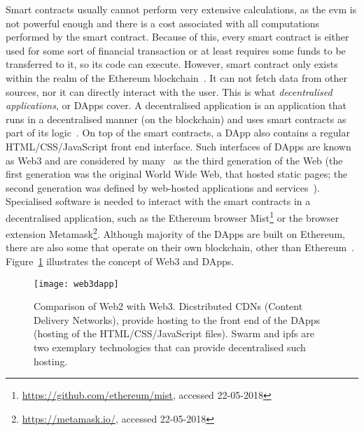 Smart contracts usually cannot perform very extensive calculations, as the \acrshort{evm} is not powerful enough and there is a cost associated with all computations performed by the smart contract. Because of this, every smart contract is either used for some sort of financial transaction or at least requires some funds to be transferred to it, so its code can execute. However, smart contract only exists within the realm of the Ethereum blockchain~\cite{JohnWeldon2016BuildingContract}. It can not fetch data from other sources, nor it can directly interact with the user. This is what \textit{decentralised applications}, or DApps cover. A decentralised application is an application that runs in a decentralised manner (on the blockchain) and uses smart contracts as part of its logic~\cite[p. 149]{Dannen2017IntroducingSolidity}. On top of the smart contracts, a DApp also contains a regular HTML/CSS/JavaScript front end interface. Such interfaces of DApps are known as Web3 and are considered by many~\cite{Dannen2017IntroducingSolidity, LukeHedger2017CrossingDevelopment} as the third generation of the Web (the first generation was the original World Wide Web, that hosted static pages; the second generation was defined by web-hosted applications and services~\cite{Dannen2017IntroducingSolidity}). Specialised software is needed to interact with the smart contracts in a decentralised application, such as the Ethereum browser Mist\footnote{\url{https://github.com/ethereum/mist}, accessed 22-05-2018} or the browser extension Metamask\footnote{\url{https://metamask.io/}, accessed 22-05-2018}. Although majority of the DApps are built on Ethereum, there are also some that operate on their own blockchain, other than Ethereum~\cite{AlyssaHertigWhatCoinDesk}. Figure~\ref{fig:web3} illustrates the concept of Web3 and DApps.

\begin{figure}
    \centering
    \texttt{[image: web3dapp]}
    \caption{Comparison of Web2 with Web3. Dicstributed CDNs (Content Delivery Networks), provide hosting to the front end of the DApps (hosting of the HTML/CSS/JavaScript files). Swarm and \acrfull{ipfs} are two exemplary technologies that can provide decentralised such hosting.}
    \label{fig:web3}
\end{figure}